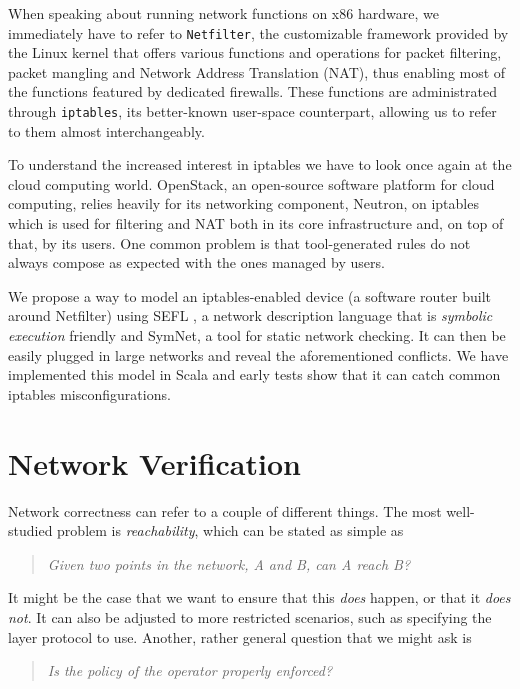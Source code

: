 \documentclass[twoside, 11pt, a4paper]{article}
\begin{document}
When speaking about running network functions on x86 hardware, we immediately
have to refer to \texttt{Netfilter}, the customizable framework provided by the
Linux kernel that offers various functions and operations for packet filtering,
packet mangling and Network Address Translation (NAT), thus enabling most of
the functions featured by dedicated firewalls. These functions are
administrated through \texttt{iptables}, its better-known user-space
counterpart, allowing us to refer to them almost interchangeably.

To understand the increased interest in iptables we have to look once again at
the cloud computing world.  OpenStack, an open-source software platform for
cloud computing, relies heavily for its networking component, Neutron, on
iptables which is used for filtering and NAT both in its core infrastructure
and, on top of that, by its users. One common problem is that tool-generated
rules do not always compose as expected with the ones managed by users.

We propose a way to model an iptables-enabled device (a software router built
around Netfilter) using SEFL \cite{stoenescu2016symnet}, a network description
language that is \emph{symbolic execution} friendly and SymNet, a tool for
static network checking. It can then be easily plugged in large networks and
reveal the aforementioned conflicts.  We have implemented this model in Scala
and early tests show that it can catch common iptables misconfigurations.

\section{Network Verification}
Network correctness can refer to a couple of different things. The most
well-studied problem is \emph{reachability}, which can be stated as simple as

\begin{quote}
\emph{Given two points in the network, A and B, can A reach B?}
\end{quote}

It might be the case that we want to ensure that this \emph{does} happen, or
that it \emph{does not}.  It can also be adjusted to more restricted scenarios,
such as specifying the  layer protocol to use.  Another, rather general
question that we might ask is

\begin{quote}
\emph{Is the policy of the operator properly enforced?}
\end{quote}
\end{document}
